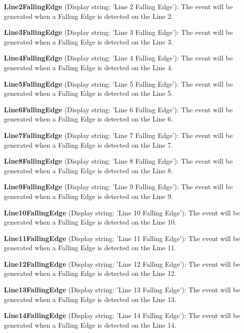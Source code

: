 \begin{DoxyItemize}
\item {\bfseries Line2\+Falling\+Edge} (Display string\+: 'Line 2 Falling Edge')\+: The event will be generated when a Falling Edge is detected on the Line 2.
\item {\bfseries Line3\+Falling\+Edge} (Display string\+: 'Line 3 Falling Edge')\+: The event will be generated when a Falling Edge is detected on the Line 3.
\item {\bfseries Line4\+Falling\+Edge} (Display string\+: 'Line 4 Falling Edge')\+: The event will be generated when a Falling Edge is detected on the Line 4.
\item {\bfseries Line5\+Falling\+Edge} (Display string\+: 'Line 5 Falling Edge')\+: The event will be generated when a Falling Edge is detected on the Line 5.
\item {\bfseries Line6\+Falling\+Edge} (Display string\+: 'Line 6 Falling Edge')\+: The event will be generated when a Falling Edge is detected on the Line 6.
\item {\bfseries Line7\+Falling\+Edge} (Display string\+: 'Line 7 Falling Edge')\+: The event will be generated when a Falling Edge is detected on the Line 7.
\item {\bfseries Line8\+Falling\+Edge} (Display string\+: 'Line 8 Falling Edge')\+: The event will be generated when a Falling Edge is detected on the Line 8.
\item {\bfseries Line9\+Falling\+Edge} (Display string\+: 'Line 9 Falling Edge')\+: The event will be generated when a Falling Edge is detected on the Line 9.
\item {\bfseries Line10\+Falling\+Edge} (Display string\+: 'Line 10 Falling Edge')\+: The event will be generated when a Falling Edge is detected on the Line 10.
\item {\bfseries Line11\+Falling\+Edge} (Display string\+: 'Line 11 Falling Edge')\+: The event will be generated when a Falling Edge is detected on the Line 11.
\item {\bfseries Line12\+Falling\+Edge} (Display string\+: 'Line 12 Falling Edge')\+: The event will be generated when a Falling Edge is detected on the Line 12.
\item {\bfseries Line13\+Falling\+Edge} (Display string\+: 'Line 13 Falling Edge')\+: The event will be generated when a Falling Edge is detected on the Line 13.
\item {\bfseries Line14\+Falling\+Edge} (Display string\+: 'Line 14 Falling Edge')\+: The event will be generated when a Falling Edge is detected on the Line 14.

\end{DoxyItemize}
